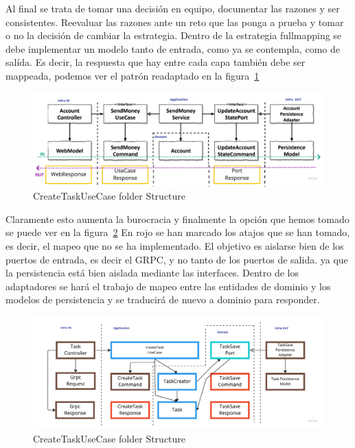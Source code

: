 Al final se trata de tomar una decisión en equipo, documentar las razones y ser consistentes.
Reevaluar las razones ante un reto que las ponga a prueba y tomar o no la decisión de cambiar la estrategia.
Dentro de la estrategia fullmapping se debe implementar un modelo tanto de entrada, como ya se contempla, como de salída.
Es decir, la respuesta que hay entre cada capa también debe ser mappeada, podemos ver el patrón readaptado en la figura~\cref{fig:GetHandMapping}

\begin{figure}[H]
    \centering
    \includegraphics[height=0.2\textheight]{./part/Ejecucion/Seguimiento/CreateTaskUseCase/img/PFM - GetHandMapping}
    \caption{CreateTaskUseCase folder Structure\cite{TomHombergs2019GYHD}}\label{fig:GetHandMapping}
\end{figure}

Claramente esto aumenta la burocracia y finalmente la opción que hemos tomado se puede ver en la figura~\cref{fig:CreateTaskUseCaseMapping} En rojo se han marcado los atajos que se han tomado, es decir, el mapeo que no se ha implementado.
El objetivo es aislarse bien de los puertos de entrada, es decir el GRPC, y no tanto de los puertos de salida.
ya que la persistencia está bien aislada mediante las interfaces.
Dentro de los adaptadores se hará el trabajo de mapeo entre las entidades de dominio y los modelos de persistencia y se traducirá de nuevo a dominio para responder.

\begin{figure}[H]
    \centering
    \includegraphics[height=0.2\textheight]{./part/Ejecucion/Seguimiento/CreateTaskUseCase/img/PFM - FinalMapping}
    \caption{CreateTaskUseCase folder Structure}\label{fig:CreateTaskUseCaseMapping}
\end{figure}

